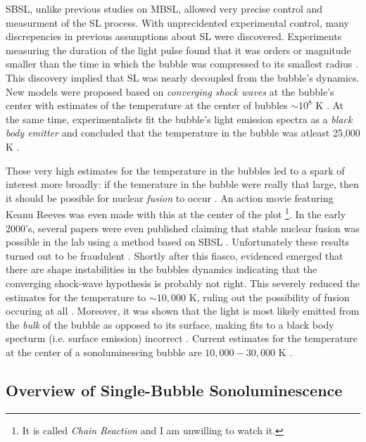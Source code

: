 \documentclass[rmp,aps,nofootinbib,superscriptaddress,floatfix]{revtex4-2}
\begin{document}
SBSL, unlike previous studies on MBSL, allowed very precise control and measurment of the SL process. With unprecidented experimental control, many discrepencies in previous assumptions about SL were discovered. Experiments measuring the duration of the light pulse found that it was orders or magnitude smaller than the time in which the bubble was compressed to its smallest radius \cite{barber1992resolving,barber1991observation}. This discovery implied that SL was nearly decoupled from the bubble's dynamics. New models were proposed based on \emph{converging shock waves} at the bubble's center with estimates of the temperature at the center of bubbles $\sim10^8$ K \cite{wu1993shock,greenspan1993sonoluminescence}. At the same time, experimentalists fit the bubble's light emission spectra as a \emph{black body emitter} and concluded that the temperature in the bubble was atleast 25,000 K \cite{hiller1992spectrum}. 

These very high estimates for the temperature in the bubbles led to a spark of interest more broadly: if the temerature in the bubble were really that large, then it should be possible for nuclear \emph{fusion} to occur \cite{}. An action movie featuring Keanu Reeves was even made with this at the center of the plot \footnote{It is called \emph{Chain Reaction} and I am unwilling to watch it.}. In the early 2000's, several papers were even published claiming that stable nuclear fusion was possible in the lab using a method based on SBSL \cite{}. Unfortunately these results turned out to be fraudulent \cite{}. Shortly after this fiasco, evidenced emerged that there are shape instabilities in the bubbles dynamics indicating that the converging shock-wave hypothesis is probably not right. This severely reduced the estimates for the temperature to $\sim 10,000$ K, ruling out the possibility of fusion occuring at all \cite{}. Moreover, it was shown that the light is most likely emitted from the \emph{bulk} of the bubble as opposed to its surface, making fits to a black body specturm (i.e. surface emission) incorrect \cite{}. Current estimates for the temperature at the center of a sonoluminescing bubble are $10,000-30,000$ K \cite{flannigan2005plasma,suslick2008inside,yasui2018acoustic,an2009diagnosing,an2008spectral,an2006mechanism}.

\subsection{Overview of Single-Bubble Sonoluminescence}
\end{document}
